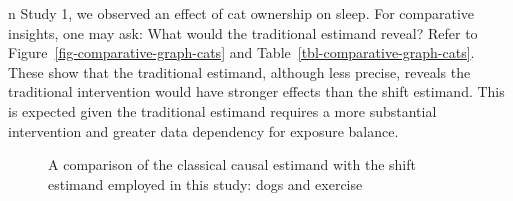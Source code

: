 \documentclass[
  singlecolumn,
  9pt]{article}
\begin{document}
n Study 1, we observed an effect of cat ownership on sleep. For
comparative insights, one may ask: What would the traditional estimand
reveal? Refer to Figure~\ref{fig-comparative-graph-cats} and
Table~\ref{tbl-comparative-graph-cats}. These show that the traditional
estimand, although less precise, reveals the traditional intervention
would have stronger effects than the shift estimand. This is expected
given the traditional estimand requires a more substantial intervention
and greater data dependency for exposure balance.

\begin{figure}


\caption{\label{fig-comparative-graph-dogs}A comparison of the classical
causal estimand with the shift estimand employed in this study: dogs and
exercise}

\end{figure}%
\end{document}
